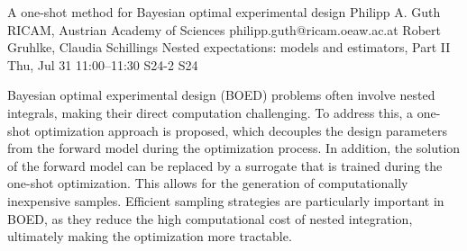 \begin{talk}
  {A one-shot method for Bayesian optimal experimental design}%
  {Philipp A. Guth}%
  {RICAM, Austrian Academy of Sciences}%
  {philipp.guth@ricam.oeaw.ac.at}%
  {Robert Gruhlke, Claudia Schillings}%
  {Nested expectations: models and estimators, Part II}%
  {Thu, Jul 31 11:00--11:30}%
  {S24-2}%
  {S24}%
    
  
Bayesian optimal experimental design (BOED) problems often involve nested integrals, making their direct computation challenging. To address this, a one-shot optimization approach is proposed, which decouples the design parameters from the forward model during the optimization process. In addition, the solution of the forward model can be replaced by a surrogate that is trained during the one-shot optimization. This allows for the generation of computationally inexpensive samples. Efficient sampling strategies are particularly important in BOED, as they reduce the high computational cost of nested integration, ultimately making the optimization more tractable.



%
%
\end{talk}

